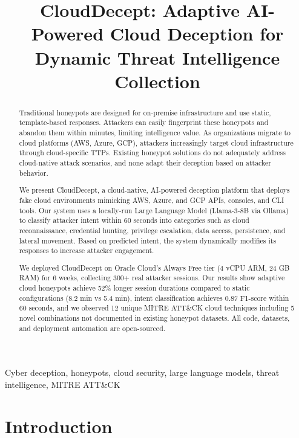 \documentclass[10pt,conference]{IEEEtran}
\title{CloudDecept: Adaptive AI-Powered Cloud Deception for Dynamic Threat Intelligence Collection}
\author{
\IEEEauthorblockN{Anonymous Author(s)}
\IEEEauthorblockA{
\textit{Institution}\\
City, Country \\
email@domain.com
}
}
\begin{document}
\maketitle

\begin{abstract}
Traditional honeypots are designed for on-premise infrastructure and use static, template-based responses.
Attackers can easily fingerprint these honeypots and abandon them within minutes, limiting intelligence value.
As organizations migrate to cloud platforms (AWS, Azure, GCP), attackers increasingly target cloud infrastructure
through cloud-specific TTPs. Existing honeypot solutions do not adequately address cloud-native attack scenarios,
and none adapt their deception based on attacker behavior.

We present CloudDecept, a cloud-native, AI-powered deception platform that deploys fake cloud environments
mimicking AWS, Azure, and GCP APIs, consoles, and CLI tools. Our system uses a locally-run Large Language Model
(Llama-3-8B via Ollama) to classify attacker intent within 60 seconds into categories such as cloud reconnaissance,
credential hunting, privilege escalation, data access, persistence, and lateral movement. Based on predicted intent,
the system dynamically modifies its responses to increase attacker engagement.

We deployed CloudDecept on Oracle Cloud's Always Free tier (4 vCPU ARM, 24 GB RAM) for 6 weeks, collecting
300+ real attacker sessions. Our results show adaptive cloud honeypots achieve 52\% longer session durations
compared to static configurations (8.2 min vs 5.4 min), intent classification achieves 0.87 F1-score within
60 seconds, and we observed 12 unique MITRE ATT&CK cloud techniques including 5 novel combinations not
documented in existing honeypot datasets. All code, datasets, and deployment automation are open-sourced.
\end{abstract}

\begin{IEEEkeywords}
Cyber deception, honeypots, cloud security, large language models, threat intelligence, MITRE ATT&CK
\end{IEEEkeywords}

\section{Introduction}
\label{sec:intro}
\end{document}
